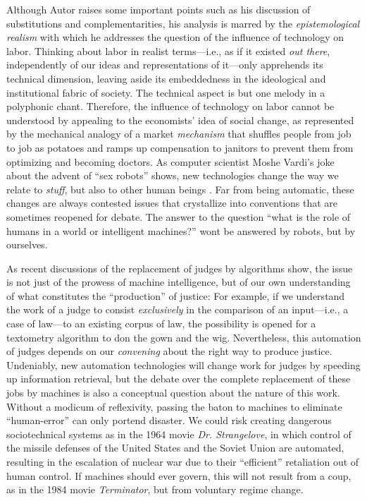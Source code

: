 \documentclass[version=last,draft=false,paper=A4,portrait,twoside=true,twocolumn=false,headinclude=false,footinclude=false,mpinclude=true,fontsize=12,BCOR=20mm,DIV=calc,pagesize=auto,open=right,chapterprefix=true,numbers=autoendperiod,headsepline=false,headings=twolinechapter,parskip=false]{scrbook}
\begin{document}
Although Autor raises some important points such as his discussion of
substitutions and complementarities, his analysis is marred by the
\emph{epistemological realism} with which he addresses the question of the
influence of technology on labor. Thinking about labor in realist
terms---i.e., as if it existed \emph{out there}, independently of our ideas and
representations of it---only apprehends its technical dimension, leaving
aside its embeddedness in the ideological and institutional fabric of
society. The technical aspect is but one melody in a polyphonic chant.
Therefore, the influence of technology on labor cannot be understood by
appealing to the economists' idea of social change, as represented by the
mechanical analogy of a market \emph{mechanism} that shuffles people from job to
job as potatoes and ramps up compensation to janitors to prevent them from
optimizing and becoming doctors. As computer scientist Moshe Vardi's joke
about the advent of ``sex robots'' shows, new technologies change the way
we relate to \emph{stuff}, but also to other human beings \autocite{yuhas2016}. Far
from being automatic, these changes are always contested issues that
crystallize into conventions that are sometimes reopened for debate. The
answer to the question ``what is the role of humans in a world or
intelligent machines?'' wont be answered by robots, but by ourselves.

 As recent discussions of the replacement of judges by algorithms show, the
issue is not just of the prowess of machine intelligence, but of our own
understanding of what constitutes the ``production'' of justice: For
example, if we understand the work of a judge to consist \emph{exclusively} in the
comparison of an input---i.e., a case of law---to an existing corpus of
law, the possibility is opened for a textometry algorithm to don the gown
and the wig. Nevertheless, this automation of judges depends on our
\emph{convening} about the right way to produce justice. Undeniably, new
automation technologies will change work for judges by speeding up
information retrieval, but the debate over the complete replacement of
these jobs by machines is also a conceptual question about the nature of
this work. Without a modicum of reflexivity, passing the baton to machines
to eliminate ``human-error'' can only portend disaster. We could risk
creating dangerous sociotechnical systems as in the 1964 movie \emph{Dr.
Strangelove}, in which control of the missile defenses of the United States
and the Soviet Union are automated, resulting in the escalation of nuclear
war due to their ``efficient'' retaliation out of human control. If
machines should ever govern, this will not result from a coup, as in the
1984 movie \emph{Terminator}, but from voluntary regime change.
\end{document}
